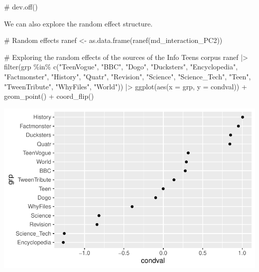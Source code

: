 \documentclass[
  letterpaper,
  DIV=11,
  numbers=noendperiod]{scrreprt}
\newenvironment{Shaded}{\begin{snugshade}}{\end{snugshade}}
\newcommand{\AttributeTok}[1]{\textcolor[rgb]{0.40,0.45,0.13}{#1}}
\newcommand{\CommentTok}[1]{\textcolor[rgb]{0.37,0.37,0.37}{#1}}
\newcommand{\FunctionTok}[1]{\textcolor[rgb]{0.28,0.35,0.67}{#1}}
\newcommand{\NormalTok}[1]{\textcolor[rgb]{0.00,0.23,0.31}{#1}}
\newcommand{\OtherTok}[1]{\textcolor[rgb]{0.00,0.23,0.31}{#1}}
\newcommand{\SpecialCharTok}[1]{\textcolor[rgb]{0.37,0.37,0.37}{#1}}
\newcommand{\StringTok}[1]{\textcolor[rgb]{0.13,0.47,0.30}{#1}}
\begin{document}
\begin{Shaded}
\begin{Highlighting}[]
\CommentTok{\# dev.off()}
\end{Highlighting}
\end{Shaded}

We can also explore the random effect structure.

\begin{Shaded}
\begin{Highlighting}[]
\CommentTok{\# Random effects}
\NormalTok{ranef }\OtherTok{\textless{}{-}} \FunctionTok{as.data.frame}\NormalTok{(}\FunctionTok{ranef}\NormalTok{(md\_interaction\_PC2))}

\CommentTok{\# Exploring the random effects of the sources of the Info Teens corpus}
\NormalTok{ranef }\SpecialCharTok{|\textgreater{}} 
  \FunctionTok{filter}\NormalTok{(grp }\SpecialCharTok{\%in\%} \FunctionTok{c}\NormalTok{(}\StringTok{"TeenVogue"}\NormalTok{, }\StringTok{"BBC"}\NormalTok{, }\StringTok{"Dogo"}\NormalTok{, }\StringTok{"Ducksters"}\NormalTok{, }\StringTok{"Encyclopedia"}\NormalTok{, }\StringTok{"Factmonster"}\NormalTok{, }\StringTok{"History"}\NormalTok{, }\StringTok{"Quatr"}\NormalTok{, }\StringTok{"Revision"}\NormalTok{, }\StringTok{"Science"}\NormalTok{, }\StringTok{"Science\_Tech"}\NormalTok{, }\StringTok{"Teen"}\NormalTok{, }\StringTok{"TweenTribute"}\NormalTok{, }\StringTok{"WhyFiles"}\NormalTok{, }\StringTok{"World"}\NormalTok{)) }\SpecialCharTok{|\textgreater{}} 
  \FunctionTok{ggplot}\NormalTok{(}\FunctionTok{aes}\NormalTok{(}\AttributeTok{x =}\NormalTok{ grp, }\AttributeTok{y =}\NormalTok{ condval)) }\SpecialCharTok{+}
  \FunctionTok{geom\_point}\NormalTok{() }\SpecialCharTok{+}
  \FunctionTok{coord\_flip}\NormalTok{()}
\end{Highlighting}
\end{Shaded}

\includegraphics{G_Ch7_Analysis_files/figure-pdf/unnamed-chunk-14-1.pdf}
\end{document}
